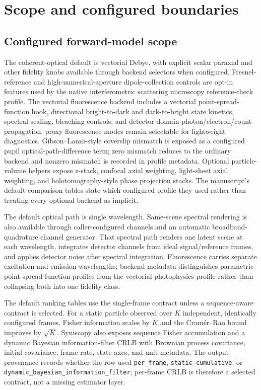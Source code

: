 \section{Scope and configured boundaries}
\label{sec:discussion}

\subsection{Configured forward-model scope}

The coherent-optical default is vectorial Debye, with explicit scalar paraxial and other fidelity knobs available through backend selectors when configured. Fresnel-reference and high-numerical-aperture dipole-collection controls are opt-in features used by the native interferometric scattering microscopy reference-check profile. The vectorial fluorescence backend includes a vectorial point-spread-function hook, directional bright-to-dark and dark-to-bright state kinetics, spectral scaling, bleaching controls, and detector-domain photon/electron/count propagation; proxy fluorescence modes remain selectable for lightweight diagnostics. Gibson--Lanni-style coverslip mismatch is exposed as a configured pupil optical-path-difference term; zero mismatch reduces to the ordinary backend and nonzero mismatch is recorded in profile metadata. Optional particle-volume helpers expose z-stack, confocal axial weighting, light-sheet axial weighting, and holotomography-style phase projection stacks. The manuscript's default comparison tables state which configured profile they used rather than treating every optional backend as implicit.

The default optical path is single wavelength. Same-scene spectral rendering is also available through caller-configured channels and an automatic broadband-quadrature channel generator. That spectral path renders one latent scene at each wavelength, integrates detector channels from ideal signal/reference frames, and applies detector noise after spectral integration. Fluorescence carries separate excitation and emission wavelengths; backend metadata distinguishes parametric point-spread-function profiles from the vectorial photophysics profile rather than collapsing both into one fidelity class.

The default ranking tables use the single-frame contract unless a sequence-aware contract is selected. For a static particle observed over $K$ independent, identically configured frames, Fisher information scales by $K$ and the Cram\'{e}r--Rao bound improves by $\sqrt{K}$. Syniscopy also exposes sequence Fisher accumulation and a dynamic Bayesian information-filter CRLB with Brownian process covariance, initial covariance, frame rate, state axes, and unit metadata. The output provenance records whether the row used \texttt{per\_frame}, \texttt{static\_cumulative}, or \texttt{dynamic\_bayesian\_information\_filter}; per-frame CRLB is therefore a selected contract, not a missing estimator layer.

